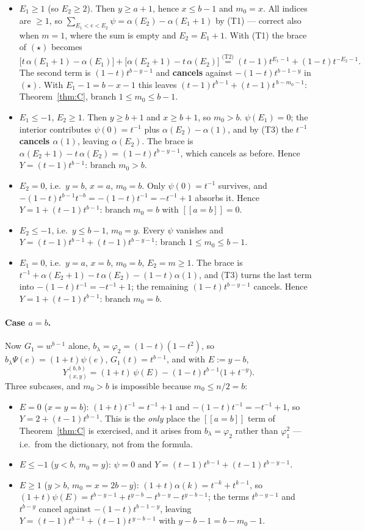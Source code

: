 \documentclass[11pt]{article}
\theoremstyle{definition}
\newcommand{\lam}{\lambda}
\newcommand{\lb}{[\![}
\newcommand{\rb}{]\!]}
\begin{document}
\begin{itemize}
\item[\textbf{(i)}] $E_1\ge1$ (so $E_2\ge2$). Then $y\ge a+1$, hence $x\le b-1$ and $m_0=x$. All
indices are $\ge1$, so $\sum_{E_1<e<E_2}\psi=\alpha(E_2)-\alpha(E_1+1)$ by (T1) --- correct also
when $m=1$, where the sum is empty and $E_2=E_1+1$. With (T1) the brace of $(\star)$ becomes
\[
  \bigl[t\,\alpha(E_1{+}1)-\alpha(E_1)\bigr]+\bigl[\alpha(E_2{+}1)-t\,\alpha(E_2)\bigr]
  \overset{\text{(T2)}}{=}(t-1)t^{E_1-1}+(1-t)t^{-E_2-1}.
\]
The second term is $(1-t)t^{b-y-1}$ and \textbf{cancels} against $-(1-t)t^{b-1-y}$ in $(\star)$.
With $E_1-1=b-x-1$ this leaves $(t-1)t^{b-1}+(t-1)t^{\,b-m_0-1}$: Theorem~\ref{thm:C}, branch
$1\le m_0\le b-1$.
\item[\textbf{(ii)}] $E_1\le-1$, $E_2\ge1$. Then $y\ge b+1$ and $x\ge b+1$, so $m_0>b$.
$\psi(E_1)=0$; the interior contributes $\psi(0)=t^{-1}$ plus $\alpha(E_2)-\alpha(1)$, and by (T3)
the $t^{-1}$ \textbf{cancels $\alpha(1)$}, leaving $\alpha(E_2)$. The brace is
$\alpha(E_2{+}1)-t\,\alpha(E_2)=(1-t)t^{b-y-1}$, which cancels as before. Hence
$Y=(t-1)t^{b-1}$: branch $m_0>b$.
\item[\textbf{(iii)}] $E_2=0$, i.e.\ $y=b$, $x=a$, $m_0=b$. Only $\psi(0)=t^{-1}$ survives, and
$-(1-t)t^{b-1}t^{-b}=-(1-t)t^{-1}=-t^{-1}+1$ absorbs it. Hence $Y=1+(t-1)t^{b-1}$: branch
$m_0=b$ with $\lb a=b\rb=0$.
\item[\textbf{(iv)}] $E_2\le-1$, i.e.\ $y\le b-1$, $m_0=y$. Every $\psi$ vanishes and
$Y=(t-1)t^{b-1}+(t-1)t^{b-y-1}$: branch $1\le m_0\le b-1$.
\item[\textbf{(v)}] $E_1=0$, i.e.\ $y=a$, $x=b$, $m_0=b$, $E_2=m\ge1$. The brace is
$t^{-1}+\alpha(E_2{+}1)-t\,\alpha(E_2)-(1-t)\alpha(1)$, and (T3) turns the last term into
$-(1-t)t^{-1}=-t^{-1}+1$; the remaining $(1-t)t^{b-y-1}$ cancels. Hence $Y=1+(t-1)t^{b-1}$:
branch $m_0=b$.
\end{itemize}

\paragraph{Case $a=b$.} Now $G_1=w^{b-1}$ alone, $b_\lam=\varphi_2=(1-t)(1-t^2)$, so
$b_\lam\Psi(e)=(1+t)\psi(e)$, $G_1(t)=t^{b-1}$, and with $E:=y-b$,
\[
  Y^{(b,b)}_{(x,y)}=(1+t)\,\psi(E)-(1-t)t^{b-1}\bigl(1+t^{-y}\bigr).
\]
Three subcases, and $m_0>b$ is impossible because $m_0\le n/2=b$:
\begin{itemize}
\item $E=0$ ($x=y=b$): $(1+t)t^{-1}=t^{-1}+1$ and $-(1-t)t^{-1}=-t^{-1}+1$, so
$Y=2+(t-1)t^{b-1}$. This is the \emph{only} place the $\lb a=b\rb$ term of Theorem~\ref{thm:C} is
exercised, and it arises from $b_\lam=\varphi_2$ rather than $\varphi_1^2$ --- i.e.\ from the
dictionary, not from the formula.
\item $E\le-1$ ($y<b$, $m_0=y$): $\psi=0$ and $Y=(t-1)t^{b-1}+(t-1)t^{b-y-1}$.
\item $E\ge1$ ($y>b$, $m_0=x=2b-y$): $(1+t)\alpha(k)=t^{-k}+t^{k-1}$, so
$(1+t)\psi(E)=t^{b-y-1}+t^{y-b}-t^{b-y}-t^{y-b-1}$; the terms $t^{b-y-1}$ and $t^{b-y}$ cancel
against $-(1-t)t^{b-1-y}$, leaving $Y=(t-1)t^{b-1}+(t-1)t^{\,y-b-1}$ with $y-b-1=b-m_0-1$.
\end{itemize}
\end{document}
